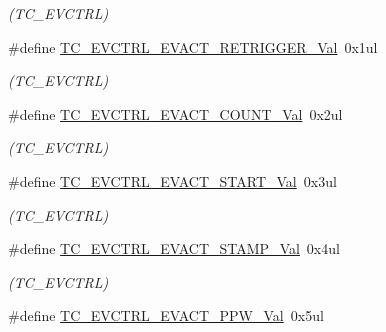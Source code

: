\begin{DoxyCompactItemize}
\begin{DoxyCompactList}\small\item\em (T\+C\+\_\+\+E\+V\+C\+T\+R\+L) \end{DoxyCompactList}\item 
\hypertarget{group___s_a_m_l21___t_c_gad84c852c18be67ba892810f8615c4937}{}\#define \hyperlink{group___s_a_m_l21___t_c_gad84c852c18be67ba892810f8615c4937}{T\+C\+\_\+\+E\+V\+C\+T\+R\+L\+\_\+\+E\+V\+A\+C\+T\+\_\+\+R\+E\+T\+R\+I\+G\+G\+E\+R\+\_\+\+Val}~0x1ul\label{group___s_a_m_l21___t_c_gad84c852c18be67ba892810f8615c4937}

\begin{DoxyCompactList}\small\item\em (T\+C\+\_\+\+E\+V\+C\+T\+R\+L) \end{DoxyCompactList}\item 
\hypertarget{group___s_a_m_l21___t_c_gaf491ae01652acf31a121fc976e34ec0c}{}\#define \hyperlink{group___s_a_m_l21___t_c_gaf491ae01652acf31a121fc976e34ec0c}{T\+C\+\_\+\+E\+V\+C\+T\+R\+L\+\_\+\+E\+V\+A\+C\+T\+\_\+\+C\+O\+U\+N\+T\+\_\+\+Val}~0x2ul\label{group___s_a_m_l21___t_c_gaf491ae01652acf31a121fc976e34ec0c}

\begin{DoxyCompactList}\small\item\em (T\+C\+\_\+\+E\+V\+C\+T\+R\+L) \end{DoxyCompactList}\item 
\hypertarget{group___s_a_m_l21___t_c_ga2851bff08dbc48025416547d4274e508}{}\#define \hyperlink{group___s_a_m_l21___t_c_ga2851bff08dbc48025416547d4274e508}{T\+C\+\_\+\+E\+V\+C\+T\+R\+L\+\_\+\+E\+V\+A\+C\+T\+\_\+\+S\+T\+A\+R\+T\+\_\+\+Val}~0x3ul\label{group___s_a_m_l21___t_c_ga2851bff08dbc48025416547d4274e508}

\begin{DoxyCompactList}\small\item\em (T\+C\+\_\+\+E\+V\+C\+T\+R\+L) \end{DoxyCompactList}\item 
\hypertarget{group___s_a_m_l21___t_c_ga8b98663a8df3b5aa57593cd8a06448b4}{}\#define \hyperlink{group___s_a_m_l21___t_c_ga8b98663a8df3b5aa57593cd8a06448b4}{T\+C\+\_\+\+E\+V\+C\+T\+R\+L\+\_\+\+E\+V\+A\+C\+T\+\_\+\+S\+T\+A\+M\+P\+\_\+\+Val}~0x4ul\label{group___s_a_m_l21___t_c_ga8b98663a8df3b5aa57593cd8a06448b4}

\begin{DoxyCompactList}\small\item\em (T\+C\+\_\+\+E\+V\+C\+T\+R\+L) \end{DoxyCompactList}\item 
\hypertarget{group___s_a_m_l21___t_c_gacc79333089f684803e5f0e892b0c7f03}{}\#define \hyperlink{group___s_a_m_l21___t_c_gacc79333089f684803e5f0e892b0c7f03}{T\+C\+\_\+\+E\+V\+C\+T\+R\+L\+\_\+\+E\+V\+A\+C\+T\+\_\+\+P\+P\+W\+\_\+\+Val}~0x5ul\label{group___s_a_m_l21___t_c_gacc79333089f684803e5f0e892b0c7f03}


\end{DoxyCompactItemize}
